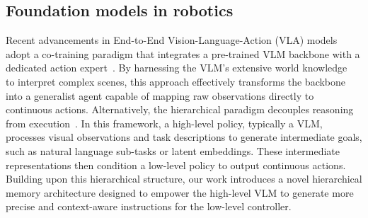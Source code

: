\subsection{Foundation models in robotics}
Recent advancements in End-to-End Vision-Language-Action (VLA) models adopt a co-training paradigm that integrates a pre-trained VLM backbone with a dedicated action expert~\cite{Black20240AV, Intelligence202505AV}. By harnessing the VLM's extensive world knowledge~\cite{Bai2025Qwen3VLTR} to interpret complex scenes, this approach effectively transforms the backbone into a generalist agent capable of mapping raw observations directly to continuous actions. 
Alternatively, the hierarchical paradigm decouples reasoning from execution~\cite{Shi2025HiRO, Li2025HAMSTERHA, Shentu2024FromLT}. In this framework, a high-level policy, typically a VLM, processes visual observations and task descriptions to generate intermediate goals, such as natural language sub-tasks or latent embeddings. These intermediate representations then condition a low-level policy to output continuous actions. Building upon this hierarchical structure, our work introduces a novel hierarchical memory architecture designed to empower the high-level VLM to generate more precise and context-aware instructions for the low-level controller.


